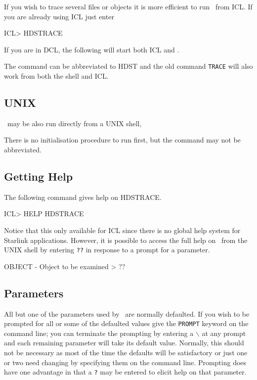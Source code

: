 \documentclass[11pt,nolof]{starlink}
\begin{document}
If you wish to trace several files or objects
it is more efficient to run \HDSTRACE\ from ICL.
If you are already using ICL just enter

\small
\begin{terminalv}
ICL> HDSTRACE
\end{terminalv}
If you are in DCL, the following will start both ICL and \HDSTRACE.
\normalsize
The command can be abbreviated to HDST and the old command \texttt{TRACE}
will also work from both the shell and ICL.

\subsection{UNIX}
\HDSTRACE\ may be also run directly from a UNIX shell,
\small
\begin{terminalv}
\end{terminalv}
\normalsize
There is no initialisation procedure to run first, but the command may
not be abbreviated.

\subsection{Getting Help}
The following command gives help on HDSTRACE.
\small
\begin{terminalv}
ICL> HELP HDSTRACE
\end{terminalv}
\normalsize
Notice that this only available for ICL since there is no global help
system for Starlink applications.  However, it is possible to access
the full help on \HDSTRACE\ from the UNIX shell by
entering \texttt{??} in response to a prompt for a parameter.

\small
\begin{terminalv}
OBJECT - Object to be examined > ??
\end{terminalv}
\normalsize
\subsection{Parameters}
All but one of the parameters used by \HDSTRACE\ are
normally defaulted.  If you wish to be prompted for all or some of the
defaulted values give the \texttt{PROMPT} keyword on the command line; you
can terminate the prompting by entering a \texttt{$\backslash$} at any
prompt and each remaining parameter will take its default value.
Normally, this should not be necessary as most of the time the defaults
will be satisfactory or just one or two need changing by specifying them
on the command line. Prompting does have one advantage in that a \texttt{?}
may be entered to elicit help on that parameter.
\end{document}
